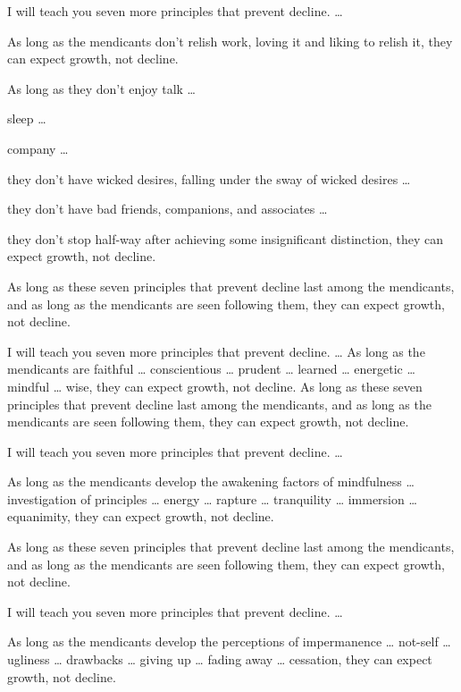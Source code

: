 \documentclass[12pt,openany]{book}%
\begin{document}
I will teach you seven more principles that prevent decline. … 

As long as the mendicants don’t relish work, loving it and liking to relish it, they can expect growth, not decline. 

As long as they don’t enjoy talk … 

sleep … 

company … 

they don’t have wicked desires, falling under the sway of wicked desires … 

they don’t have bad friends, companions, and associates … 

they don’t stop half-way after achieving some insignificant distinction, they can expect growth, not decline. 

As long as these seven principles that prevent decline last among the mendicants, and as long as the mendicants are seen following them, they can expect growth, not decline. 

I will teach you seven more principles that prevent decline. … As long as the mendicants are faithful … conscientious … prudent … learned … energetic … mindful … wise, they can expect growth, not decline. As long as these seven principles that prevent decline last among the mendicants, and as long as the mendicants are seen following them, they can expect growth, not decline. 

I will teach you seven more principles that prevent decline. … 

As long as the mendicants develop the awakening factors of mindfulness … investigation of principles … energy … rapture … tranquility … immersion … equanimity, they can expect growth, not decline. 

As long as these seven principles that prevent decline last among the mendicants, and as long as the mendicants are seen following them, they can expect growth, not decline. 

I will teach you seven more principles that prevent decline. … 

As long as the mendicants develop the perceptions of impermanence … not-self … ugliness … drawbacks … giving up … fading away … cessation, they can expect growth, not decline. 
\end{document}
